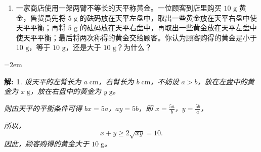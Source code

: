 \documentclass[aspectratio=169,13pt,fleqn,t] {beamer}
\newtheorem*{solve}{解:}
\begin{document}
\begin{frame}
	\begin{enumerate}[9.]
		\item 一家商店使用一架两臂不等长的天平称黄金。一位顾客到店里购买 \(10\text{ g}\) 黄金，售货员先将 \(5\text{ g}\) 的砝码放在天平左盘中，取出一些黄金放在天平右盘中使天平平衡；再将 \(5\text{ g}\) 的砝码放在天平右盘中，再取出一些黄金放在天平左盘中使天平平衡；最后将两次称得的黄金交给顾客。你认为顾客购得的黄金是小于 \(10\text{ g}\)，等于 \(10\text{ g}\)，还是大于 \(10\text{ g}\)？为什么？
	\end{enumerate}
	
	\leftskip=2em\vspace{-1ex}
	\begin{minipage}{0.9\textwidth}
		
		\begin{solve}
			设天平的左臂长为 \(a\;\mathrm{ cm}\)，右臂长为 \(b\;\mathrm{ cm}\)，不妨设 \(a > b\)，放在左盘中的黄金为 \(x \;\mathrm{ g}\)，放在右盘中的黄金为 \(y\;\mathrm{ g}\)。
			
			则由天平的平衡条件可得 \(bx = 5a\)，\(ay = 5b\)，即 \(x = \frac{5a}{b}\)，\(y = \frac{5b}{a}\)，
			
			所以，
			\[
			x + y \geqslant 2\sqrt{xy} = 10.
			\]
			因此，顾客购得的黄金大于 $10 \;\mathrm{g}$。
		\end{solve}
	\end{minipage}
\end{frame}
\end{document}

